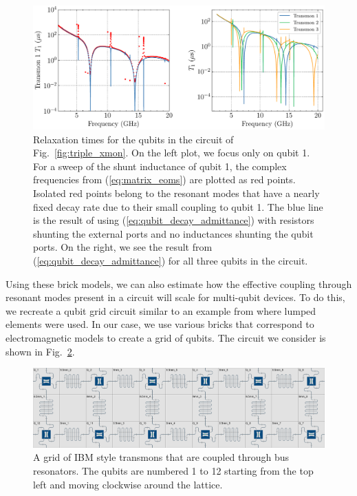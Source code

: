 \begin{figure}[h!]
    \centering
    \includegraphics[width=\textwidth]{figures/three_qubit_T1.pdf}
    \caption{Relaxation times for the qubits in the circuit of Fig.\ \ref{fig:triple_xmon}. On the left plot, we focus only on qubit 1. For a sweep of the shunt inductance of qubit 1, the complex frequencies from (\ref{eq:matrix_eoms}) are plotted as red points. Isolated red points belong to the resonant modes that have a nearly fixed decay rate due to their small coupling to qubit 1. The blue line is the result of using (\ref{eq:qubit_decay_admittance}) with resistors shunting the external ports and no inductances shunting the qubit ports. On the right, we see the result from (\ref{eq:qubit_decay_admittance}) for all three qubits in the circuit.}
    \label{fig:triple_xmon_T1}
\end{figure}

Using these brick models, we can also estimate how the effective coupling through resonant modes present in a circuit will scale for multi-qubit devices. To do this, we recreate a qubit grid circuit similar to an example from \cite{solgun_sirf} where lumped elements were used. In our case, we use various bricks that correspond to electromagnetic models to create a grid of qubits. The circuit we consider is shown in Fig.\ \ref{fig:2x6}.

\begin{figure}[h!]
    \centering
    \includegraphics[width=\textwidth]{figures/2x6.png}
    \caption{A grid of IBM style transmons \cite{solgun_sirf} that are coupled through bus resonators. The qubits are numbered 1 to 12 starting from the top left and moving clockwise around the lattice.}
    \label{fig:2x6}
\end{figure}

